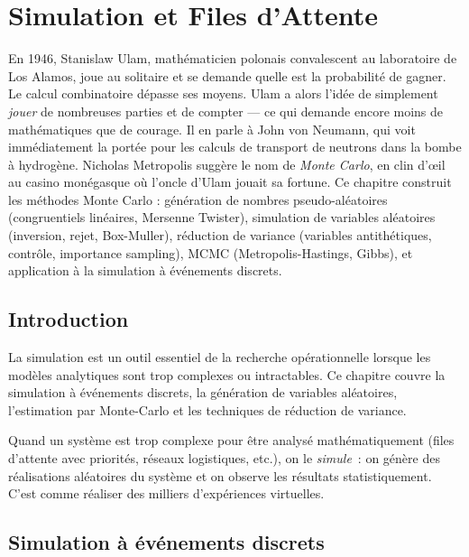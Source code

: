 \chapter{Simulation et Files d'Attente}
\label{ch:simulation}

En 1946, Stanislaw Ulam, mathématicien polonais convalescent au laboratoire de Los Alamos, joue au solitaire et se demande quelle est la probabilité de gagner. Le calcul combinatoire dépasse ses moyens. Ulam a alors l'idée de simplement \emph{jouer} de nombreuses parties et de compter --- ce qui demande encore moins de mathématiques que de courage. Il en parle à John von Neumann, qui voit immédiatement la portée pour les calculs de transport de neutrons dans la bombe à hydrogène. Nicholas Metropolis suggère le nom de \emph{Monte Carlo}, en clin d'œil au casino monégasque où l'oncle d'Ulam jouait sa fortune. Ce chapitre construit les méthodes Monte Carlo : génération de nombres pseudo-aléatoires (congruentiels linéaires, Mersenne Twister), simulation de variables aléatoires (inversion, rejet, Box-Muller), réduction de variance (variables antithétiques, contrôle, importance sampling), MCMC (Metropolis-Hastings, Gibbs), et application à la simulation à événements discrets.

\section{Introduction}

La simulation est un outil essentiel de la recherche op\'erationnelle lorsque
les mod\`eles analytiques sont trop complexes ou intractables. Ce chapitre
couvre la simulation \`a \'ev\'enements discrets, la g\'en\'eration de
variables al\'eatoires, l'estimation par Monte-Carlo et les techniques de
r\'eduction de variance.

\begin{intuition}
Quand un syst\`eme est trop complexe pour \^etre analys\'e math\'ematiquement
(files d'attente avec priorit\'es, r\'eseaux logistiques, etc.), on le
\emph{simule}~: on g\'en\`ere des r\'ealisations al\'eatoires du syst\`eme et
on observe les r\'esultats statistiquement. C'est comme r\'ealiser des milliers
d'exp\'eriences virtuelles.
\end{intuition}

\section{Simulation \`a \'ev\'enements discrets}

